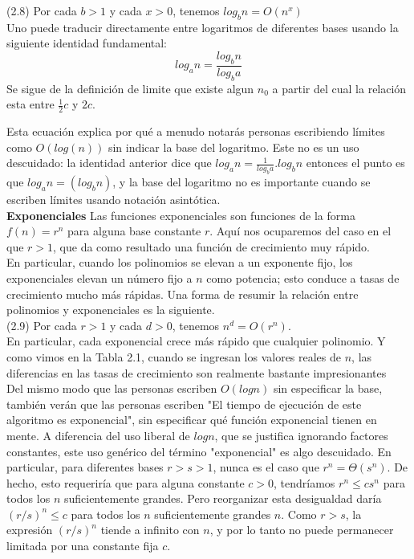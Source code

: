 \documentclass[a4paper]{article}
\begin{document}
(2.8) Por cada $b>1$ y cada $x>0$, tenemos $log_bn = O(n^x)$\\

Uno puede traducir directamente entre logaritmos de diferentes bases usando la siguiente identidad fundamental:\\

\begin{equation}
log_an = \frac{log_bn}{log_ba}
\end{equation}
Se sigue de la definición de limite que existe algun $n_0$ a partir del cual la relación esta entre $\frac{1}{2}c$ y $2c$.

Esta ecuación explica por qué a menudo notarás personas escribiendo límites como $O(log(n))$ sin indicar la base del logaritmo. Este no es un uso descuidado: la identidad anterior dice que $log_an = \frac{1}{log_ba}.log_bn$ entonces el punto es que $log_an = (log_bn)$, y la base del logaritmo no es importante cuando se escriben límites usando notación asintótica.\\

\textbf{Exponenciales} Las funciones exponenciales son funciones de la forma $f(n) = r^n$ para alguna base constante $r$. Aquí nos ocuparemos del caso en el que $r>1$, que da como resultado una función de crecimiento muy rápido.\\

En particular, cuando los polinomios se elevan a un exponente fijo, los exponenciales elevan un número fijo a $n$ como potencia; esto conduce a tasas de crecimiento mucho más rápidas. Una forma de resumir la relación entre polinomios y exponenciales es la siguiente.\\

(2.9) Por cada $r>1$ y cada $d>0$, tenemos $n^d=O(r^n)$.\\

En particular, cada exponencial crece más rápido que cualquier polinomio. Y como vimos en la Tabla 2.1, cuando se ingresan los valores reales de $n$, las diferencias en las tasas de crecimiento son realmente bastante impresionantes\\

Del mismo modo que las personas escriben $O(log n)$ sin especificar la base, también verán que las personas escriben "El tiempo de ejecución de este algoritmo es exponencial", sin especificar qué función exponencial tienen en mente. A diferencia del uso liberal de $log n$, que se justifica ignorando factores constantes, este uso genérico del término "exponencial" es algo descuidado. En particular, para diferentes bases $r>s>1$, nunca es el caso que $r^n = \Theta(s^n)$. De hecho, esto requeriría que para alguna constante $c>0$, tendríamos $r^n ≤ cs^n$ para todos los $n$ suficientemente grandes. Pero reorganizar esta desigualdad daría $(r/s)^n ≤ c$ para todos los $n$ suficientemente grandes $n$. Como $r>s$, la expresión $(r/s)^n$ tiende a infinito con $n$, y por lo tanto no puede permanecer limitada por una constante fija $c$.\\
\end{document}
